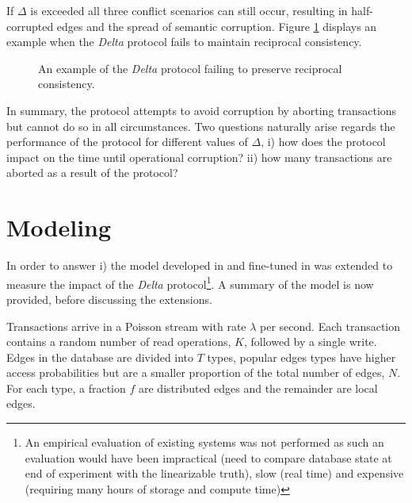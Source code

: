 \documentclass[sigplan,10pt]{acmart}
\begin{document}
If $\Delta$ is exceeded all three conflict scenarios can still occur, resulting in half-corrupted edges and the spread of semantic corruption. Figure \ref{corruption-again} displays an example when the \emph{Delta} protocol fails to maintain reciprocal consistency.

\begin{figure}[H]
  \centering
  \caption{An example of the \emph{Delta} protocol failing to preserve reciprocal consistency.}
  \label{corruption-again}
\end{figure}

In summary, the protocol attempts to avoid corruption by aborting transactions but cannot do so in all circumstances. Two questions naturally arise regards the performance of the protocol for different values of  $\Delta$, i) how does the protocol impact on the time until operational corruption? ii) how many transactions are aborted as a result of the protocol?

\section{Modeling}
\label{sec:modeling}

In order to answer i) the model developed in \cite{Ezhilchelvan2018} and fine-tuned in \cite{Webber2019} was extended to measure the impact of the \emph{Delta} protocol\footnote{An empirical evaluation of existing systems was not performed as such an evaluation would have been impractical (need to compare database state at end of experiment with the linearizable truth), slow (real time) and expensive (requiring many hours of storage and compute time)}. A summary of the model is now provided, before discussing the extensions.

Transactions arrive in a Poisson stream with rate $\lambda$ per second. Each transaction contains a random number of read operations, $K$, followed by a single write. Edges in the database are divided into $T$ types, popular edges types have higher access probabilities but are a smaller proportion of the total number of edges, $N$. For each type, a fraction $f$ are distributed edges and the remainder are local edges.
\end{document}

